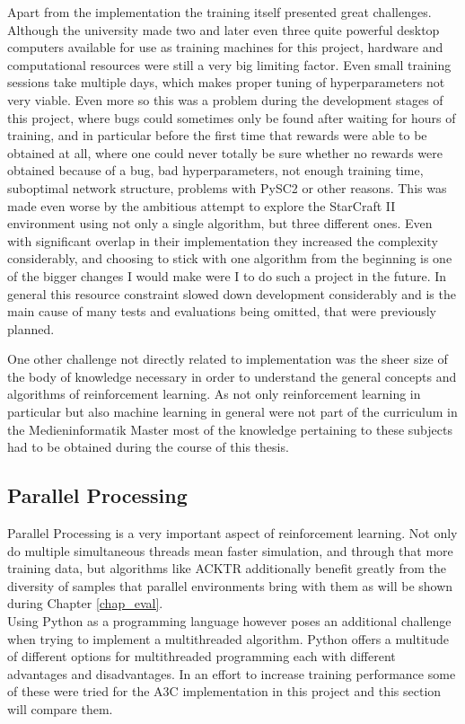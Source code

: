 Apart from the implementation the training itself presented great challenges. Although the university made two and later even three quite powerful desktop computers available for use as training machines for this project, hardware and computational resources were still a very big limiting factor. Even small training sessions take multiple days, which makes proper tuning of hyperparameters not very viable. Even more so this was a problem during the development stages of this project, where bugs could sometimes only be found after waiting for hours of training, and in particular before the first time that rewards were able to be obtained at all, where one could never totally be sure whether no rewards were obtained because of a bug, bad hyperparameters, not enough training time, suboptimal network structure, problems with PySC2 or other reasons. This was made even worse by the ambitious attempt to explore the StarCraft II environment using not only a single algorithm, but three different ones. Even with significant overlap in their implementation they increased the complexity considerably, and choosing to stick with one algorithm from the beginning is one of the bigger changes I would make were I to do such a project in the future. In general this resource constraint slowed down development considerably and is the main cause of many tests and evaluations being omitted, that were previously planned. 

One other challenge not directly related to implementation was the sheer size of the body of knowledge necessary in order to understand the general concepts and algorithms of reinforcement learning. As not only reinforcement learning in particular but also machine learning in general were not part of the curriculum in the Medieninformatik Master most of the knowledge pertaining to these subjects had to be obtained during the course of this thesis.


\subsection{Parallel Processing}
Parallel Processing is a very important aspect of reinforcement learning. Not only do multiple simultaneous threads mean faster simulation, and through that more training data, but algorithms like ACKTR additionally benefit greatly from the diversity of samples that parallel environments bring with them as will be shown during Chapter \ref{chap_eval}.\\
Using Python as a programming language however poses an additional challenge when trying to implement a multithreaded algorithm. Python offers a multitude of different options for multithreaded programming each with different advantages and disadvantages.
In an effort to increase training performance some of these were tried for the A3C implementation in this project and this section will compare them.

